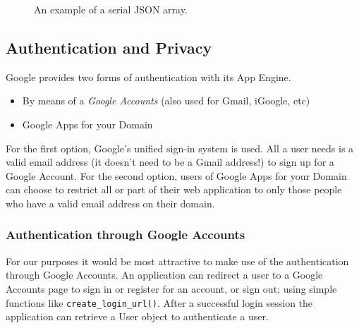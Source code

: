 \begin{figure}[ht] %
\begin{center}
\begin{code}
["/home/bboterm/app-engine/",{"key1":"value1","key2":"value2","key3":"value3"},
  "R0lGODlh(...)KSAAOw=="]
\end{code}
\caption{An example of a serial JSON array.\label{clientimpl-json}}
\end{center}
\end{figure}

% 
% 
% 
 
\subsection{Authentication and Privacy}
Google provides two forms of authentication with its App Engine.

\begin{itemize}
\item By means of a \emph{Google Accounts} (also used for Gmail, iGoogle, etc)
\item Google Apps for your Domain
\end{itemize}

For the first option, Google's unified sign-in system is used. All a user needs
is a valid email address (it doesn't need to be a Gmail address!) to sign up for
a Google Account. For the second option, users of Google Apps for your Domain can
choose to restrict all or part of their web application to only those people who
have a valid email address on their domain.

\subsubsection{Authentication through Google Accounts}
For our purposes it would be most attractive to make use of the authentication
through Google Accounts. An application can redirect a user to a Google Accounts
page to sign in or register for an account, or sign out; using simple functions
like \texttt{create\_login\_url()}. After a successful login session the
application can retrieve a User object to authenticate a user.

